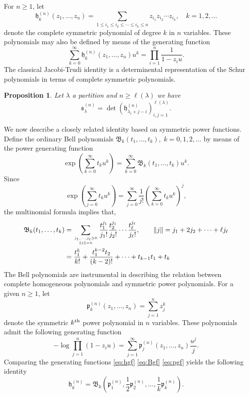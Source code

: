 \documentclass{amsart}
\newtheorem{proposition}{Proposition}
\theoremstyle{definition}
\newcommand{\fB}{\mathfrak{B}}
\newcommand{\fh}{\mathfrak{h}}
\newcommand{\fs}{\mathfrak{s}}
\newcommand{\fp}{\mathfrak{p}}
\newcommand{\supth}{{}^{\rm{th}}}
\begin{document}
For $n\geq 1$, let
\[ \fh^{(n)}_k(z_1,\ldots, z_n) = \sum_{1\leq i_1 \leq i_2\leq \cdots
    \leq i_k \leq n} \!\!\!\!\!\!z_{i_1}z_{i_2} \cdots z_{i_k},\quad
  k=1,2,\ldots \] denote the complete symmetric polynomial of degree
$k$ in $n$ variables.  These polynomials may also be defined by means
of the generating function
\begin{equation}
  \label{eq:hgf}
  \sum_{k=0}^\infty \fh^{(n)}_k(z_1,\ldots, z_n)u^k = \prod_{i=1}^n
  \frac{1}{1-z_i u}.
\end{equation}
The classical Jacobi-Trudi identity is a determinental representation
of the Schur polynomials in terms of complete symmetric polynomials.
\begin{proposition}
  Let $\lambda$ a partition and $n\geq \ell(\lambda)$ we have
  \begin{equation}
    \label{eq:fslambdadet}
    \fs^{(n)}_\lambda = \det \left( \fh^{(n)}_{\lambda_i+j-i}
    \right)_{i,j=1}^{\ell(\lambda)}.  
  \end{equation}
\end{proposition}

We now describe a closely related identity based on symmetric power
functions.  Define the ordinary Bell polynomials
$\fB_k(t_1,\ldots, t_k),\; k=0,1,2,\ldots$ by means of the power
generating function
\begin{equation}
  \label{eq:Bgf}
  \exp\left(\sum_{k=0}^\infty t_k u^k\right) = \sum_{k=0}^\infty
  \fB_k(t_1,\ldots, t_k) u^k.  
\end{equation}
Since
\[ \exp\left(\sum_{j=0}^\infty t_k u^k\right) = \sum_{j=0}^\infty
  \frac{1}{j!}\left(\sum_{k=0}^\infty t_k u^k\right)^j ,\] the multinomial
formula implies that,
\[
  \begin{aligned}
    \fB_k(t_1,\ldots, t_k) &= \sum_{j_1,\ldots, j_\ell\geq 0 \atop
      \Vert j\Vert=n} \frac{t^{j_1}_1}{j_1!} \frac{t^{j_1}_2}{j_2!}
    \cdots \frac{t^{j_\ell}_\ell}{j_\ell!},\qquad \Vert j \Vert = j_1
    + 2j_2
    + \cdots + \ell j_\ell\\
    &= \frac{t_1^k}{k!} + \frac{t_1^{k-2}t_2}{(k-2)!} + \cdots +
    t_{k-1} t_1 + t_k
  \end{aligned}
\]
The Bell polynomials are instrumental in describing the relation
between complete homogeneous polynomials and symmetric power
polynomials.  For a given $n\geq 1$, let
\[ \fp^{(n)}_k(z_1,\ldots, z_n) = \sum_{j=1}^n z_j^k \] denote the
symmetric $k\supth$ power polynomial in $n$ variables. These
polynomials admit the following generating function
\begin{equation}
  \label{eq:pgf}
  - \log  \prod_{j=1}^n (1-z_iu) = \sum_{j=1}^\infty \fp^{(n)}_j(z_1,\ldots,
  z_n) \frac{u^j}{j}.
\end{equation}
Comparing the generating functions \eqref{eq:hgf} \eqref{eq:Bgf} \eqref{eq:pgf}
yields the following identity
\begin{equation}
  \label{eq:hkBkp}
  \fh^{(n)}_k = \fB_k\left(\fp^{(n)}_1, \frac12 \fp^{(n)}_2,\ldots,
    \frac1k \fp^{(n)}_k\right). 
\end{equation}
\end{document}
